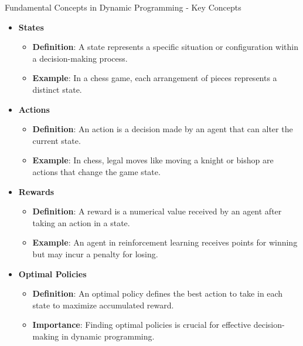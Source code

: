 \documentclass[aspectratio=169]{beamer}
\begin{document}
\begin{frame}[fragile]{Fundamental Concepts in Dynamic Programming - Key Concepts}
    \begin{itemize}
        \item \textbf{States} 
            \begin{itemize}
                \item \textbf{Definition}: A state represents a specific situation or configuration within a decision-making process.
                \item \textbf{Example}: In a chess game, each arrangement of pieces represents a distinct state.
            \end{itemize}
        
        \item \textbf{Actions} 
            \begin{itemize}
                \item \textbf{Definition}: An action is a decision made by an agent that can alter the current state.
                \item \textbf{Example}: In chess, legal moves like moving a knight or bishop are actions that change the game state.
            \end{itemize}
            
        \item \textbf{Rewards} 
            \begin{itemize}
                \item \textbf{Definition}: A reward is a numerical value received by an agent after taking an action in a state.
                \item \textbf{Example}: An agent in reinforcement learning receives points for winning but may incur a penalty for losing.
            \end{itemize}

        \item \textbf{Optimal Policies} 
            \begin{itemize}
                \item \textbf{Definition}: An optimal policy defines the best action to take in each state to maximize accumulated reward.
                \item \textbf{Importance}: Finding optimal policies is crucial for effective decision-making in dynamic programming.
            \end{itemize}
    \end{itemize}
\end{frame}
\end{document}
